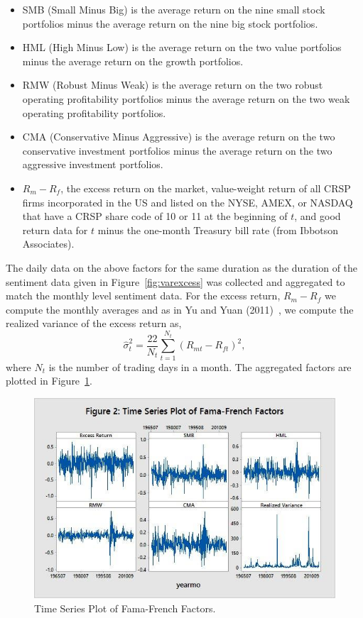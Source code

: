 \begin{itemize}
\item SMB (Small Minus Big) is the average return on the nine small stock portfolios minus the average return on the nine big stock portfolios.

\item HML (High Minus Low) is the average return on the two value portfolios minus the average return on the growth portfolios.

\item RMW (Robust Minus Weak) is the average return on the two robust operating profitability portfolios minus the average return on the two weak operating profitability portfolios.

\item CMA (Conservative Minus Aggressive) is the average return on the two conservative investment portfolios minus the average return on the two aggressive investment portfolios.

\item $R_m-R_f$, the excess return on the market, value-weight return of all CRSP firms incorporated in the US and listed on the NYSE, AMEX, or NASDAQ that have a CRSP share code of 10 or 11 at the beginning of $t$, and good return data for $t$ minus the one-month Treasury bill rate (from Ibbotson Associates).
\end{itemize}


The daily data on the above factors for the same duration as the duration of the sentiment data given in Figure~\ref{fig:varexcess} was collected and aggregated to match the monthly level sentiment data. For the excess return, $R_m-R_f$ we compute the monthly averages and as in Yu and Yuan (2011)~\cite{yuyuan}, we compute the realized variance of the excess return as,
	\begin{equation} \label{fig:varexcess}
	\widehat{\sigma}_t^2=\frac{22}{N_t}\sum_{t=1}^{N_t}(R_{mt}-R_{ft})^2,
	\end{equation}
where $N_t$ is the number of trading days in a month. The aggregated factors are plotted in Figure~\ref{fig:timefamafrench}.
 
	\begin{figure}[!ht]
	\centering
	\includegraphics[width=\textwidth]{chapters/chapter_news_an/figures/ch4sec1famafrench.jpg}
	\caption{Time Series Plot of Fama-French Factors.\label{fig:timefamafrench}}
	\end{figure}

